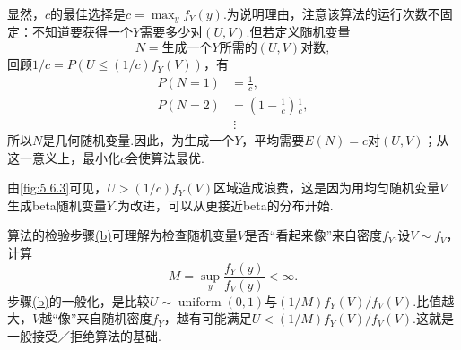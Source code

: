 显然，$c$的最佳选择是$c=\max_yf_Y(y)$.为说明理由，注意该算法的运行次数不固定：不知道要获得一个$Y$需要多少对$(U,V)$.但若定义随机变量
\begin{equation}\label{eq:5.6.12}
N=\text{生成一个$Y$所需的$(U,V)$对数},
\end{equation}
回顾$1/c=P(U\le(1/c)f_Y(V))$，有
$$\begin{aligned}P(N=1)&=\frac1c,\\P(N=2)&=\left(1-\frac1c\right)\frac1c,\\&\ \vdots\end{aligned}$$
所以$N$是几何随机变量.因此，为生成一个$Y$，平均需要$E(N)=c$对$(U,V)$；从这一意义上，最小化$c$会使算法最优.

由\autoref{fig:5.6.3}可见，$U>(1/c)f_Y(V)$区域造成浪费，这是因为用均匀随机变量$V$生成beta随机变量$Y$.为改进，可以从更接近beta的分布开始.

算法的检验步骤\hyperref[itm:ex:5.6.7:b]{(b)}可理解为检查随机变量$V$是否“看起来像”来自密度$f_Y$.设$V\sim f_V$，计算
$$M=\sup_y\frac{f_Y(y)}{f_V(y)}<\infty.$$
步骤\hyperref[itm:ex:5.6.7:b]{(b)}的一般化，是比较$U\sim\operatorname{uniform}(0,1)$与$(1/M)f_Y(V)/f_V(V)$.比值越大，$V$越“像”来自随机密度$f_Y$，越有可能满足$U<(1/M)f_Y(V)/f_V(V)$.这就是一般接受／拒绝算法的基础.
